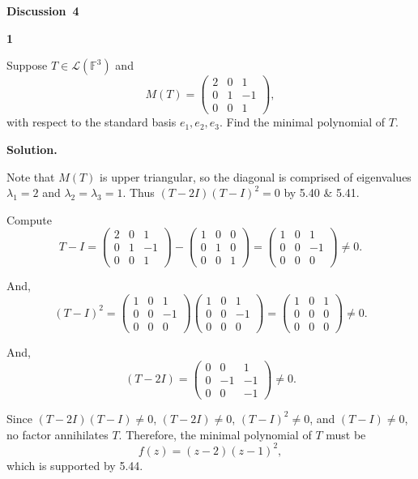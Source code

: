 \documentclass[11pt]{article}
\newcommand{\AssignmentType}{Discussion} %
\newcommand{\AssignmentNumber}{4}
\newcommand{\ProblemDivider}[1]{%
  \vspace{1.0em}
  \noindent\textbf{#1}\par
  \vspace{0.35em}
}
\newcommand{\ProblemAnnounce}{\noindent}
\newcommand{\SolutionAnnounce}{\noindent\textbf{Solution.}\par\medskip}
\begin{document}
\begin{center}
  {\Large \textbf{\AssignmentType~\AssignmentNumber}}
\end{center}
\vspace{0.75em}

\ProblemDivider{1}

\begin{problemBox}
\ProblemAnnounce
Suppose $T\in \mathcal{L}(\mathbb{F}^3)$ and
\[
M(T)=
\begin{pmatrix}
2 & 0 & 1\\
0 & 1 & -1\\
0 & 0 & 1
\end{pmatrix},
\]
with respect to the standard basis $e_1,e_2,e_3$. Find the minimal polynomial of $T$.
\end{problemBox}

\begin{solutionBox}
\SolutionAnnounce
\doublespacing

Note that $M(T)$ is upper triangular, so the diagonal is comprised of eigenvalues
$\lambda_1=2$ and $\lambda_2=\lambda_3=1$.
Thus $(T-2I)(T-I)^2=0$ by 5.40 \& 5.41.

Compute
\[
T-I=
\begin{pmatrix}
2 & 0 & 1\\
0 & 1 & -1\\
0 & 0 & 1
\end{pmatrix}
-
\begin{pmatrix}
1 & 0 & 0\\
0 & 1 & 0\\
0 & 0 & 1
\end{pmatrix}
=
\begin{pmatrix}
1 & 0 & 1\\
0 & 0 & -1\\
0 & 0 & 0
\end{pmatrix}
\neq 0.
\]

And,
\[
(T-I)^2 =
\begin{pmatrix}
1 & 0 & 1\\
0 & 0 & -1\\
0 & 0 & 0
\end{pmatrix}
\begin{pmatrix}
1 & 0 & 1\\
0 & 0 & -1\\
0 & 0 & 0
\end{pmatrix}
=
\begin{pmatrix}
1 & 0 & 1\\
0 & 0 & 0\\
0 & 0 & 0
\end{pmatrix}
\neq 0.
\]

And,
\[
(T-2I)=
\begin{pmatrix}
0 & 0 & 1\\
0 & -1 & -1\\
0 & 0 & -1
\end{pmatrix}
\neq 0.
\]

Since $(T-2I)(T-I)\neq 0$, $(T-2I)\neq 0$, $(T-I)^2\neq 0$, and $(T-I)\neq 0$,
no factor annihilates $T$. Therefore, the minimal polynomial of $T$ must be
\[
f(z)=(z-2)(z-1)^2,
\]
which is supported by 5.44.

\end{solutionBox}
\newpage
\end{document}
